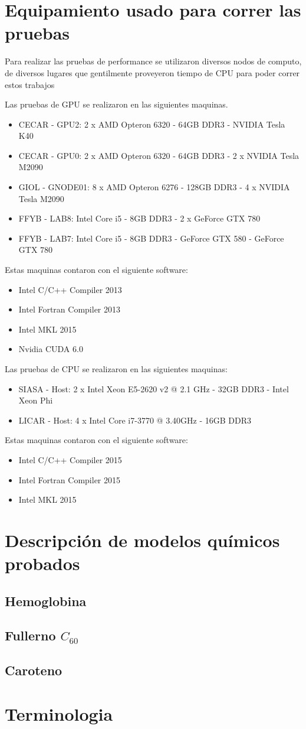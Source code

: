 \chapter{Equipamiento usado para correr las pruebas}

Para realizar las pruebas de performance se utilizaron diversos nodos de computo, de diversos lugares que
gentilmente proveyeron tiempo de CPU para poder correr estos trabajos

Las pruebas de GPU se realizaron en las siguientes maquinas.

\begin{itemize}
  \item CECAR - GPU2: 2 x AMD Opteron 6320 - 64GB DDR3 - NVIDIA Tesla K40
  \item CECAR - GPU0: 2 x AMD Opteron 6320 - 64GB DDR3 - 2 x NVIDIA Tesla M2090
  \item GIOL - GNODE01: 8 x AMD Opteron 6276 - 128GB DDR3 - 4 x NVIDIA Tesla M2090
  \item FFYB - LAB8: Intel Core i5 - 8GB DDR3 - 2 x GeForce GTX 780
  \item FFYB - LAB7: Intel Core i5 - 8GB DDR3 - GeForce GTX 580 - GeForce GTX 780
\end{itemize}

Estas maquinas contaron con el siguiente software:
\begin{itemize}
  \item Intel C/C++ Compiler 2013
  \item Intel Fortran Compiler 2013
  \item Intel MKL 2015
  \item Nvidia CUDA 6.0
\end{itemize}

Las pruebas de CPU se realizaron en las siguientes maquinas:
\begin{itemize}
  \item SIASA - Host: 2 x Intel Xeon E5-2620 v2 @ 2.1 GHz - 32GB DDR3 - Intel Xeon Phi
  \item LICAR - Host: 4 x Intel Core i7-3770 @ 3.40GHz - 16GB DDR3
\end{itemize}

Estas maquinas contaron con el siguiente software:
\begin{itemize}
  \item Intel C/C++ Compiler 2015
  \item Intel Fortran Compiler 2015
  \item Intel MKL 2015
\end{itemize}

\chapter{Descripci\'on de modelos qu\'imicos probados}

\section*{Hemoglobina}
\section*{Fullerno $C_{60}$}
\section*{Caroteno}

\chapter{Terminologia}
